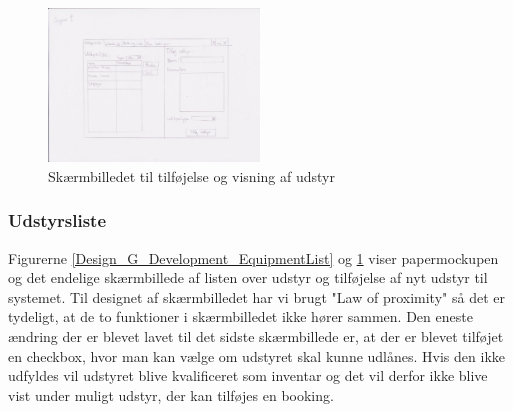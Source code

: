 \begin{figure}[h!]
  \centering
    \includegraphics[width=0.5\textwidth]{Appendix/GUI-Prototype/PaperMockup/UdstyrsListe}
  \caption{Skærmbilledet til tilføjelse og visning af udstyr}
\label{Design_G_Development_EquipmentList_Final}
\end{figure}

\subsubsection{Udstyrsliste}
Figurerne \ref{Design_G_Development_EquipmentList} og \ref{Design_G_Development_EquipmentList_Final} viser papermockupen og det endelige skærmbillede af listen over udstyr og tilføjelse af nyt udstyr til systemet. Til designet af skærmbilledet har vi brugt "Law of proximity" så det er tydeligt, at de to funktioner i skærmbilledet ikke hører sammen. Den eneste ændring der er blevet lavet til det sidste skærmbillede er, at der er blevet tilføjet en checkbox, hvor man kan vælge om udstyret skal kunne udlånes. Hvis den ikke udfyldes vil udstyret blive kvalificeret som inventar og det vil derfor ikke blive vist under muligt udstyr, der kan tilføjes en booking. 